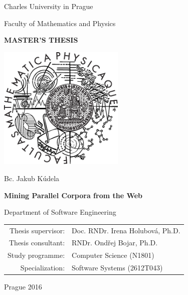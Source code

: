 \begin{titlepage}
\begin{center}

\large
Charles University in Prague

\medskip

Faculty of Mathematics and Physics

\vfill

{\Large \textbf{MASTER'S THESIS}}

\vfill

\includegraphics[width=60mm]{images/mff_logo.eps}

\vfill
\vspace{5mm}

{\LARGE Bc. Jakub Kúdela}

\vspace{15mm}

{\LARGE \textbf{Mining Parallel Corpora from the Web}}

\vfill

Department of Software Engineering

\vfill

\begin{tabular}{rl}
Thesis supervisor: & Doc. RNDr. Irena Holubová, Ph.D. \\
\noalign{\vspace{2mm}}
Thesis consultant: & RNDr. Ondřej Bojar, Ph.D. \\
\noalign{\vspace{2mm}}
Study programme: & Computer Science (N1801) \\
\noalign{\vspace{2mm}}
Specialization: & Software Systems (2612T043) \\
\end{tabular}

\vfill

Prague 2016

\end{center}
\end{titlepage}
